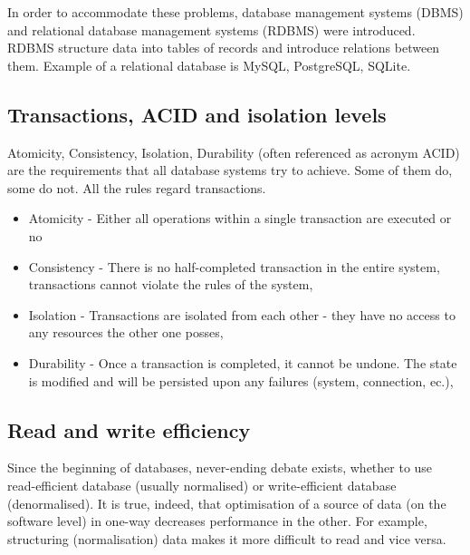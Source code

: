 In order to accommodate these problems, database management systems (DBMS) and relational database management systems (RDBMS) were introduced. RDBMS structure data into tables of records and introduce relations between them. Example of a relational database is MySQL, PostgreSQL, SQLite. 


\subsection{Transactions, ACID and isolation levels}
\label{subsec:acid}

Atomicity, Consistency, Isolation, Durability (often referenced as acronym ACID) are the requirements that all database systems try to achieve. Some of them do, some do not. All the rules regard transactions. 

\begin{itemize}
\item Atomicity - Either all operations within a single transaction are executed or no 
\item Consistency - There is no half-completed transaction in the entire system, transactions cannot violate the rules of the system,
\item Isolation - Transactions are isolated from each other - they have no access to any resources the other one posses,
\item Durability - Once a transaction is completed, it cannot be undone. The state is modified and will be persisted upon any failures (system, connection, ec.), 
\end{itemize}




\subsection{Read and write efficiency}
\label{subsec:rwEfficiency}

Since the beginning of databases, never-ending debate exists, whether to use read-efficient database (usually normalised) or write-efficient database (denormalised). It is true, indeed, that optimisation of a source of data (on the software level) in one-way decreases performance in the other. For example, structuring (normalisation) data makes it more difficult to read and vice versa. 

